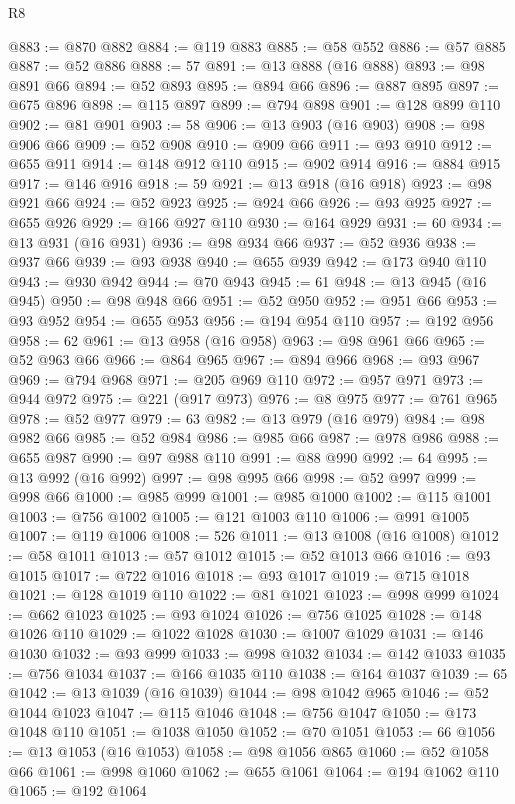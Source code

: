 \begin{lexlean}{R8}
\begin{coremodule}
@883 := @870 @882
@884 := @119 @883
@885 := @58 @552
@886 := @57 @885
@887 := @52 @886
@888 := 57
@891 := @13 @888 (@16 @888)
@893 := @98 @891 @66
@894 := @52 @893
@895 := @894 @66
@896 := @887 @895
@897 := @675 @896
@898 := @115 @897
@899 := @794 @898
@901 := @128 @899 @110
@902 := @81 @901
@903 := 58
@906 := @13 @903 (@16 @903)
@908 := @98 @906 @66
@909 := @52 @908
@910 := @909 @66
@911 := @93 @910
@912 := @655 @911
@914 := @148 @912 @110
@915 := @902 @914
@916 := @884 @915
@917 := @146 @916
@918 := 59
@921 := @13 @918 (@16 @918)
@923 := @98 @921 @66
@924 := @52 @923
@925 := @924 @66
@926 := @93 @925
@927 := @655 @926
@929 := @166 @927 @110
@930 := @164 @929
@931 := 60
@934 := @13 @931 (@16 @931)
@936 := @98 @934 @66
@937 := @52 @936
@938 := @937 @66
@939 := @93 @938
@940 := @655 @939
@942 := @173 @940 @110
@943 := @930 @942
@944 := @70 @943
@945 := 61
@948 := @13 @945 (@16 @945)
@950 := @98 @948 @66
@951 := @52 @950
@952 := @951 @66
@953 := @93 @952
@954 := @655 @953
@956 := @194 @954 @110
@957 := @192 @956
@958 := 62
@961 := @13 @958 (@16 @958)
@963 := @98 @961 @66
@965 := @52 @963 @66
@966 := @864 @965
@967 := @894 @966
@968 := @93 @967
@969 := @794 @968
@971 := @205 @969 @110
@972 := @957 @971
@973 := @944 @972
@975 := @221 (@917 @973)
@976 := @8 @975
@977 := @761 @965
@978 := @52 @977
@979 := 63
@982 := @13 @979 (@16 @979)
@984 := @98 @982 @66
@985 := @52 @984
@986 := @985 @66
@987 := @978 @986
@988 := @655 @987
@990 := @97 @988 @110
@991 := @88 @990
@992 := 64
@995 := @13 @992 (@16 @992)
@997 := @98 @995 @66
@998 := @52 @997
@999 := @998 @66
@1000 := @985 @999
@1001 := @985 @1000
@1002 := @115 @1001
@1003 := @756 @1002
@1005 := @121 @1003 @110
@1006 := @991 @1005
@1007 := @119 @1006
@1008 := 526
@1011 := @13 @1008 (@16 @1008)
@1012 := @58 @1011
@1013 := @57 @1012
@1015 := @52 @1013 @66
@1016 := @93 @1015
@1017 := @722 @1016
@1018 := @93 @1017
@1019 := @715 @1018
@1021 := @128 @1019 @110
@1022 := @81 @1021
@1023 := @998 @999
@1024 := @662 @1023
@1025 := @93 @1024
@1026 := @756 @1025
@1028 := @148 @1026 @110
@1029 := @1022 @1028
@1030 := @1007 @1029
@1031 := @146 @1030
@1032 := @93 @999
@1033 := @998 @1032
@1034 := @142 @1033
@1035 := @756 @1034
@1037 := @166 @1035 @110
@1038 := @164 @1037
@1039 := 65
@1042 := @13 @1039 (@16 @1039)
@1044 := @98 @1042 @965
@1046 := @52 @1044 @1023
@1047 := @115 @1046
@1048 := @756 @1047
@1050 := @173 @1048 @110
@1051 := @1038 @1050
@1052 := @70 @1051
@1053 := 66
@1056 := @13 @1053 (@16 @1053)
@1058 := @98 @1056 @865
@1060 := @52 @1058 @66
@1061 := @998 @1060
@1062 := @655 @1061
@1064 := @194 @1062 @110
@1065 := @192 @1064

\end{coremodule}
\end{lexlean}
